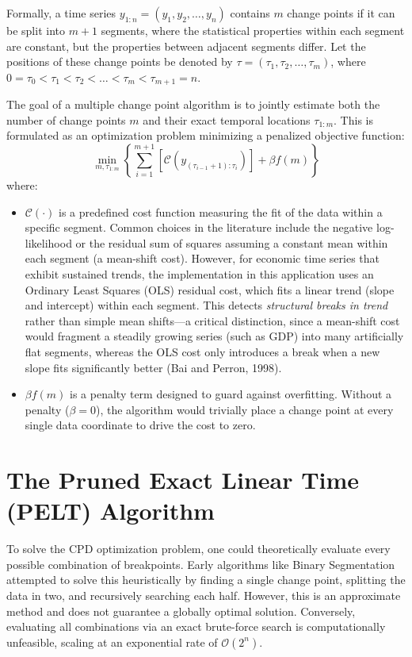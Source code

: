Formally, a time series $y_{1:n} = (y_1, y_2, \dots, y_n)$ contains $m$ change points if it can be split into $m+1$ segments, where the statistical properties within each segment are constant, but the properties between adjacent segments differ. Let the positions of these change points be denoted by $\tau = (\tau_1, \tau_2, \dots, \tau_m)$, where $0 = \tau_0 < \tau_1 < \tau_2 < \dots < \tau_m < \tau_{m+1} = n$.

The goal of a multiple change point algorithm is to jointly estimate both the number of change points $m$ and their exact temporal locations $\tau_{1:m}$. This is formulated as an optimization problem minimizing a penalized objective function:
\begin{equation}
    \min_{m, \tau_{1:m}} \left\{ \sum_{i=1}^{m+1} \left[ \mathcal{C}(y_{(\tau_{i-1}+1):\tau_i}) \right] + \beta f(m) \right\}
\end{equation}
where:
\begin{itemize}
    \item $\mathcal{C}(\cdot)$ is a predefined cost function measuring the fit of the data within a specific segment. Common choices in the literature include the negative log-likelihood or the residual sum of squares assuming a constant mean within each segment (a mean-shift cost). However, for economic time series that exhibit sustained trends, the implementation in this application uses an Ordinary Least Squares (OLS) residual cost, which fits a linear trend (slope and intercept) within each segment. This detects \textit{structural breaks in trend} rather than simple mean shifts—a critical distinction, since a mean-shift cost would fragment a steadily growing series (such as GDP) into many artificially flat segments, whereas the OLS cost only introduces a break when a new slope fits significantly better (Bai and Perron, 1998).
    \item $\beta f(m)$ is a penalty term designed to guard against overfitting. Without a penalty ($\beta = 0$), the algorithm would trivially place a change point at every single data coordinate to drive the cost to zero. 
\end{itemize}

\section{The Pruned Exact Linear Time (PELT) Algorithm}
To solve the CPD optimization problem, one could theoretically evaluate every possible combination of breakpoints. Early algorithms like Binary Segmentation attempted to solve this heuristically by finding a single change point, splitting the data in two, and recursively searching each half. However, this is an approximate method and does not guarantee a globally optimal solution. Conversely, evaluating all combinations via an exact brute-force search is computationally unfeasible, scaling at an exponential rate of $\mathcal{O}(2^n)$. 

